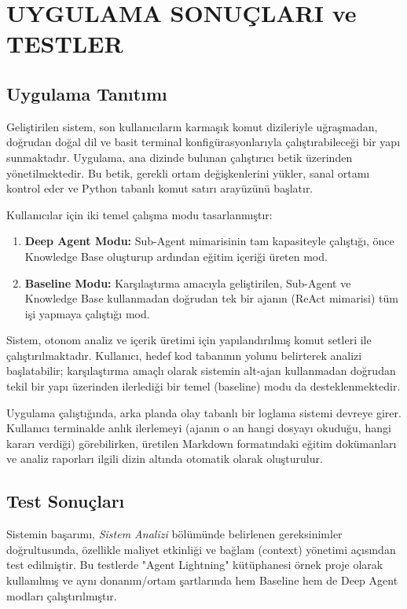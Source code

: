 \chapter{UYGULAMA SONUÇLARI ve TESTLER}
\label{ch:uygulama-sonuclari}

\section{Uygulama Tanıtımı}
\label{sec:uygulama-tanitimi}

Geliştirilen sistem, son kullanıcıların karmaşık komut dizileriyle uğraşmadan, doğrudan doğal dil ve basit terminal konfigürasyonlarıyla çalıştırabileceği bir yapı sunmaktadır. Uygulama, ana dizinde bulunan çalıştırıcı betik üzerinden yönetilmektedir. Bu betik, gerekli ortam değişkenlerini yükler, sanal ortamı kontrol eder ve Python tabanlı komut satırı arayüzünü başlatır.

Kullanıcılar için iki temel çalışma modu tasarlanmıştır:
\begin{enumerate}
    \item \textbf{Deep Agent Modu:} Sub-Agent mimarisinin tam kapasiteyle çalıştığı, önce Knowledge Base oluşturup ardından eğitim içeriği üreten mod.
    \item \textbf{Baseline Modu:} Karşılaştırma amacıyla geliştirilen, Sub-Agent ve Knowledge Base kullanmadan doğrudan tek bir ajanın (ReAct mimarisi) tüm işi yapmaya çalıştığı mod.
\end{enumerate}

Sistem, otonom analiz ve içerik üretimi için yapılandırılmış komut setleri ile çalıştırılmaktadır. Kullanıcı, hedef kod tabanının yolunu belirterek analizi başlatabilir; karşılaştırma amaçlı olarak sistemin alt-ajan kullanmadan doğrudan tekil bir yapı üzerinden ilerlediği bir temel (baseline) modu da desteklenmektedir.

Uygulama çalıştığında, arka planda olay tabanlı bir loglama sistemi devreye girer. Kullanıcı terminalde anlık ilerlemeyi (ajanın o an hangi dosyayı okuduğu, hangi kararı verdiği) görebilirken, üretilen Markdown formatındaki eğitim dokümanları ve analiz raporları ilgili dizin altında otomatik olarak oluşturulur.

\section{Test Sonuçları}
\label{sec:test-sonuclari}

Sistemin başarımı, \textit{Sistem Analizi} bölümünde belirlenen gereksinimler doğrultusunda, özellikle maliyet etkinliği ve bağlam (context) yönetimi açısından test edilmiştir. Bu testlerde "Agent Lightning" kütüphanesi örnek proje olarak kullanılmış ve aynı donanım/ortam şartlarında hem Baseline hem de Deep Agent modları çalıştırılmıştır.

